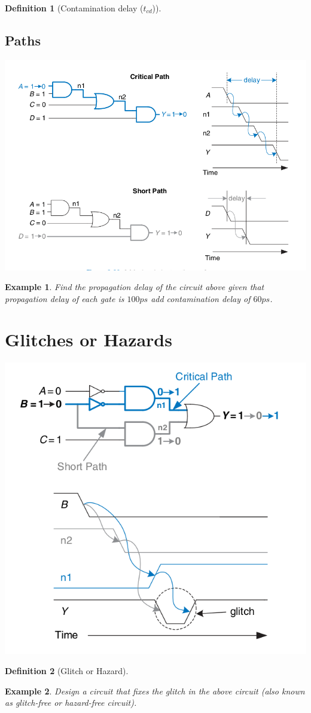 \documentclass{article}
\newtheorem{example}{Example}
\newtheorem{definition}{Definition}
\begin{document}
\begin{definition}[Contamination delay ($t_{cd}$)]
\end{definition}
\vspace{5em}

\subsection{Paths}
\includegraphics[width=0.8\linewidth]{fig/fig2.68-short-path-and-critical-path.png}
\begin{example}
  Find the propagation delay of the circuit above given that propagation delay
  of each gate is $100 ps$  add contamination delay of $60ps$.
\end{example}
\vspace{10em}

\section{Glitches or Hazards}
\includegraphics[width=0.6\linewidth]{fig/fig2.76-timing-of-a-glitch.png}
\begin{definition}[Glitch or Hazard]

\end{definition}
\vspace{5em}

\begin{example}
  Design a circuit that fixes the glitch in the above circuit (also known as
  glitch-free or hazard-free circuit).
\end{example}
\vspace{10em}

%
%
\end{document}
